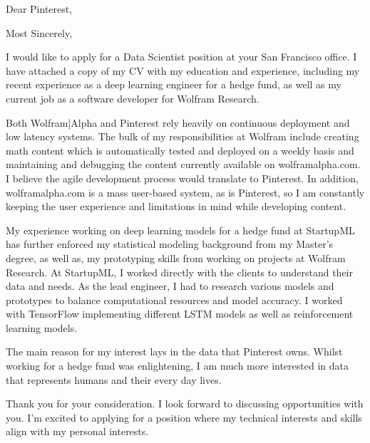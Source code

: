 \documentclass[11pt,a4paper,unicode]{moderncv}
\begin{document}
\vspace*{-6mm}

\vspace*{-6mm}



\date{\today} %


\opening{{Dear Pinterest},} %
\closing{Most Sincerely,} %

\makelettertitle %
	I would like to apply for a Data Scientist position at your San Francisco office. I have attached a copy of my CV with my education and experience, including my recent experience as a deep learning engineer for a hedge fund, as well as my current job as a software developer for Wolfram Research. 
			
\vspace{3mm}  
	Both Wolfram|Alpha and Pinterest rely heavily on continuous deployment and low latency systems. The bulk of my responsibilities at Wolfram include creating math content which is automatically tested and deployed on a weekly basis and maintaining and debugging the content currently available on wolframalpha.com. I believe the agile development process would translate to Pinterest. In addition, wolframalpha.com is a mass user-based system, as is Pinterest, so I am constantly keeping the user experience and limitations in mind while developing content. 
	
\vspace{3mm}  
	My experience working on deep learning models for a hedge fund at StartupML has further enforced my statistical modeling background from my Master's degree, as well as, my prototyping skills from working on projects at Wolfram Research. At StartupML, I worked directly with the clients to understand their data and needs. As the lead engineer, I had to research various models and prototypes to balance computational resources and model accuracy. I worked with TensorFlow implementing different LSTM models as well as reinforcement learning models. 
	

\vspace{3mm}	
	The main reason for my interest lays in the data that Pinterest owns. Whilst working for a hedge fund was enlightening, I am much more interested in data that represents humans and their every day lives.
	
\vspace{3mm}  
	Thank you for your consideration. I look forward to discussing opportunities with you. I'm excited to applying for a position where my technical interests and skills align with my personal interests. 

\makeletterclosing %
\end{document}
